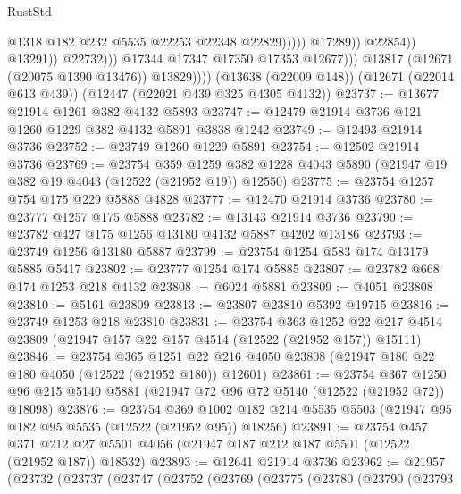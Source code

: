 \begin{lexlean}{RustStd}
\begin{coremodule}
                                              @1318
                                              @182
                                              @232
                                              @5535
                                              @22253
                                              @22348
                                              @22829)))))
                                    @17289))
                                @22854))
                            @13291))
                        @22732)))
                  @17344
                  @17347
                  @17350
                  @17353
                  @12677)))
            @13817
            (@12671 (@20075 @1390 @13476))
            @13829))))
    (@13638 (@22009 @148))
    (@12671 (@22014 @613 @439))
    (@12447 (@22021 @439 @325 @4305 @4132))
@23737 := @13677 @21914 @1261 @382 @4132 @5893
@23747 := @12479 @21914 @3736 @121 @1260 @1229 @382 @4132 @5891 @3838 @1242
@23749 := @12493 @21914 @3736
@23752 := @23749 @1260 @1229 @5891
@23754 := @12502 @21914 @3736
@23769 := @23754
    @359
    @1259
    @382
    @1228
    @4043
    @5890
    (@21947 @19 @382 @19 @4043 (@12522 (@21952 @19)) @12550)
@23775 := @23754 @1257 @754 @175 @229 @5888 @4828
@23777 := @12470 @21914 @3736
@23780 := @23777 @1257 @175 @5888
@23782 := @13143 @21914 @3736
@23790 := @23782 @427 @175 @1256 @13180 @4132 @5887 @4202 @13186
@23793 := @23749 @1256 @13180 @5887
@23799 := @23754 @1254 @583 @174 @13179 @5885 @5417
@23802 := @23777 @1254 @174 @5885
@23807 := @23782 @668 @174 @1253 @218 @4132
@23808 := @6024 @5881
@23809 := @4051 @23808
@23810 := @5161 @23809
@23813 := @23807 @23810 @5392 @19715
@23816 := @23749 @1253 @218 @23810
@23831 := @23754
    @363
    @1252
    @22
    @217
    @4514
    @23809
    (@21947 @157 @22 @157 @4514 (@12522 (@21952 @157)) @15111)
@23846 := @23754
    @365
    @1251
    @22
    @216
    @4050
    @23808
    (@21947 @180 @22 @180 @4050 (@12522 (@21952 @180)) @12601)
@23861 := @23754
    @367
    @1250
    @96
    @215
    @5140
    @5881
    (@21947 @72 @96 @72 @5140 (@12522 (@21952 @72)) @18098)
@23876 := @23754
    @369
    @1002
    @182
    @214
    @5535
    @5503
    (@21947 @95 @182 @95 @5535 (@12522 (@21952 @95)) @18256)
@23891 := @23754
    @457
    @371
    @212
    @27
    @5501
    @4056
    (@21947 @187 @212 @187 @5501 (@12522 (@21952 @187)) @18532)
@23893 := @12641 @21914 @3736
@23962 := @21957
    (@23732
      (@23737
        (@23747
          (@23752
            (@23769
              (@23775
                (@23780
                  (@23790
                    (@23793

\end{coremodule}
\end{lexlean}
